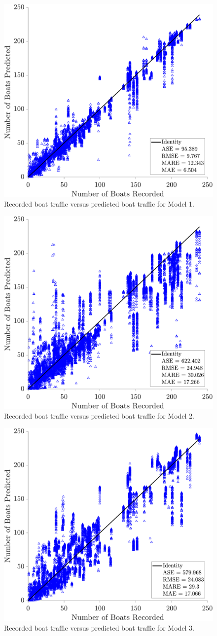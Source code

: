 \documentclass[
10pt, %
letterpaper, %
twoside, %
headinclude,footinclude, %
BCOR5mm, %
]{scrartcl}
\begin{document}
	\begin{figure}
	\centering
	\includegraphics[width=0.65\linewidth]{figures/24-15-1.pdf}
	\caption{Recorded boat traffic versus predicted boat traffic for Model 1.} 
	\label{fig:MOD1}
\end{figure}
%
\begin{figure}
	\centering
	\includegraphics[width=0.65\linewidth]{figures/16-15-1.pdf}
	\caption{Recorded boat traffic versus predicted boat traffic for Model 2.} 
	\label{fig:MOD2}
\end{figure}
%
\begin{figure}
	\centering
	\includegraphics[width=0.65\linewidth]{figures/19-15-1.pdf}
	\caption{Recorded boat traffic versus predicted boat traffic for Model 3.} 
	\label{fig:MOD3}
\end{figure}
\end{document}
